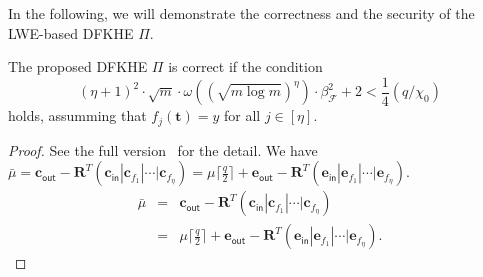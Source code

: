 \documentclass[runningheads,10pt]{llncs}
\begin{document}

In the following, we will demonstrate the correctness and the security of the LWE-based DFKHE $\Pi$.


 
\begin{theorem}[Correctness of $\Pi$] \label{theo2}
	The proposed DFKHE $\Pi$ is correct 
	if the condition \begin{equation}\label{key}
	(\eta+1)^2\cdot \sqrt{m}\cdot \omega( (\sqrt{m\log m})^{\eta})\cdot \beta_{\mathcal{F}}^2+2<\frac{1}{4}(q/\chi_0)
	\end{equation} holds, assumming  that $f_j(\mathbf{t})=y$ for all $j\in [\eta]$. 
\end{theorem}


\begin{proof}
	See the full version~\cite{fullversion} for the detail.
\iffalse 
We have
	$ \bar{\mu}= \textbf{c}_{\textsf{out}}-\textbf{R}^T(\textbf{c}_\textsf{in}|\textbf{c}_{f_{1}}|\cdots|\textbf{c}_{f_{\eta}})=\mu \lceil \frac{q}{2} \rceil+ \textbf{e}_{\textsf{out}} -\textbf{R}^T(\textbf{e}_{\textsf{in}}|\textbf{e}_{f_1}|\cdots|\textbf{e}_{f_\eta}).$
	\iffalse
	\begin{eqnarray*}
		\bar{\mu}&=& \textbf{c}_{\textsf{out}}-\textbf{R}^T(\textbf{c}_\textsf{in}|\textbf{c}_{f_{1}}|\cdots|\textbf{c}_{f_{\eta}})\\
		&=& \mu \lceil \frac{q}{2} \rceil+ \textbf{e}_{\textsf{out}} -\textbf{R}^T(\textbf{e}_{\textsf{in}}|\textbf{e}_{f_1}|\cdots|\textbf{e}_{f_\eta}).
	\end{eqnarray*}

\end{proof}
\end{document}
